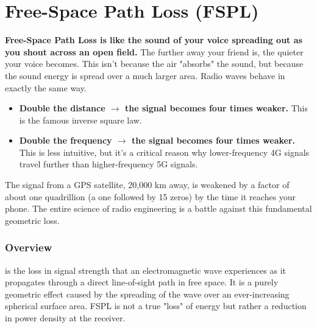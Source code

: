 
\chapter{Free-Space Path Loss (FSPL)}
\label{ch:fspl}

\begin{nontechnical}
    \textbf{Free-Space Path Loss is like the sound of your voice spreading out as you shout across an open field.} The further away your friend is, the quieter your voice becomes. This isn't because the air "absorbs" the sound, but because the sound energy is spread over a much larger area. Radio waves behave in exactly the same way.

    \begin{itemize}
        \item \textbf{Double the distance $\rightarrow$ the signal becomes four times weaker.} This is the famous inverse square law.
        \item \textbf{Double the frequency $\rightarrow$ the signal becomes four times weaker.} This is less intuitive, but it's a critical reason why lower-frequency 4G signals travel further than higher-frequency 5G signals.
    \end{itemize}

     The signal from a GPS satellite, 20,000 km away, is weakened by a factor of about one quadrillion (a one followed by 15 zeros) by the time it reaches your phone. The entire science of radio engineering is a battle against this fundamental geometric loss.
\end{nontechnical}


\subsection{Overview}

 is the loss in signal strength that an electromagnetic wave experiences as it propagates through a direct line-of-sight path in free space. It is a purely geometric effect caused by the spreading of the wave over an ever-increasing spherical surface area. FSPL is not a true "loss" of energy but rather a reduction in power density at the receiver.

